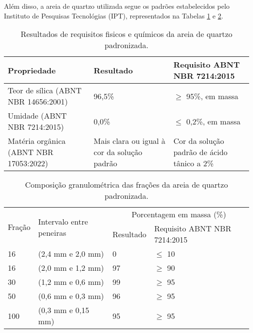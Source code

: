 Além disso, a areia de quartzo utilizada segue os padrões estabelecidos pelo Instituto de Pesquisas Tecnológias (IPT), representados na Tabelas \ref{tab:areia_quartzo_propriedades} e \ref{tab:areia_quartzo_granulometria}.

\begin{table}[htb]
    \caption{Resultados de requisitos fisicos e químicos da areia de quartzo padronizada.}
    \label{tab:areia_quartzo_propriedades}
    \center
    \begin{tabular}{p{} p{} p{}}
        \hline
        Propriedade & Resultado & Requisito ABNT NBR 7214:2015 \\
        \hline
        Teor de sílica (ABNT NBR 14656:2001) & 96,5\% & $\geq$ 95\%, em massa \\
        Umidade (ABNT NBR 7214:2015) & 0,0\% & $\leq$ 0,2\%, em massa \\
        Matéria orgânica (ABNT NBR 17053:2022) & Mais clara ou igual à cor da solução padrão & Cor da solução padrão de ácido tânico a 2\% \\
        \hline
    \end{tabular}
\end{table}

\begin{table}[htb]
    \caption{Composição granulométrica das frações da areia de quartzo padronizada.}
    \label{tab:areia_quartzo_granulometria}
    \centering
    \begin{tabular}{p{} p{} p{} p{}}
        \hline
        \multirow{2}{=}{Fração} & \multirow{2}{=}{Intervalo entre peneiras} & \multicolumn{2}{c}{Porcentagem em massa (\%)} \\ \cline{3-4}       
        & & Resultado & Requisito ABNT NBR 7214:2015 \\
        \hline
        16 & (2,4 mm e 2,0 mm) & 0 & $\leq$ 10 \\
        16 & (2,0 mm e 1,2 mm) & 97 & $\geq$ 90 \\
        30 & (1,2 mm e 0,6 mm) & 99 & $\geq$ 95 \\
        50 & (0,6 mm e 0,3 mm) & 96 & $\geq$ 95 \\
        100 & (0,3 mm e 0,15 mm) & 95 & $\geq$ 95 \\
        \hline
    \end{tabular}
\end{table}

